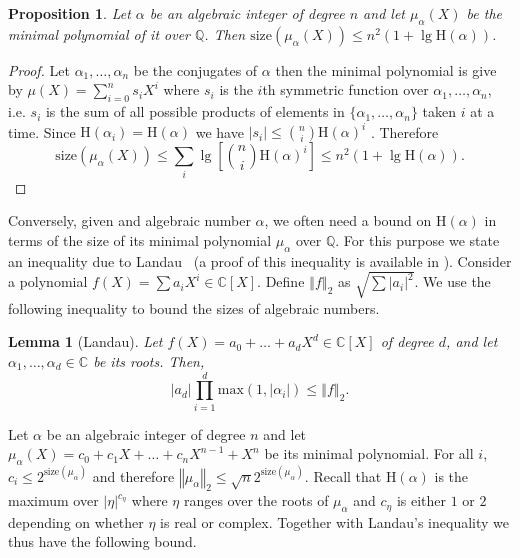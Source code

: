 \documentclass[11pt]{madras}%
\newtheorem{lemma}[theorem]{Lemma}
\newtheorem{proposition}[theorem]{Proposition}
\theoremstyle{remark}
\newcommand{\size}[1]{{\ensuremath{\mathrm{size}\left(#1\right)}}}
\newcommand{\abs}[1]{{\ensuremath{\left\vert #1 \right\vert}}}
\newcommand{\norm}[1]{{\ensuremath{\left\Vert #1 \right\Vert}}}
\newcommand{\Height}[1]{\ensuremath{\mathrm{H}\left(#1\right)}}
\begin{document}
\begin{proposition}\label{prop-bound-minpoly}
  Let $\alpha$ be an algebraic integer of degree $n$ and let
  $\mu_\alpha(X)$ be the minimal polynomial of it over $\mathbb{Q}$.
  Then $\size{\mu_\alpha(X)} \leq n^2 (1 + \lg{\Height{\alpha}})$.
\end{proposition}
\begin{proof}
  Let $\alpha_1,\ldots,\alpha_n$ be the conjugates of $\alpha$ then
  the minimal polynomial is give by $\mu(X) = \sum_{i=0}^n s_i X^i$
  where $s_i$ is the $i$th symmetric function over
  $\alpha_1,\ldots,\alpha_n$, i.e. $s_i$ is the sum of all possible
  products of elements in $\{\alpha_1,\ldots,\alpha_n\}$ taken $i$ at
  a time.  Since $\Height{\alpha_i} = \Height{\alpha}$ we have $|s_i|
  \leq {n \choose i} \Height{\alpha}^i$ .  Therefore
  \[ 
  \size{\mu_\alpha(X)} \leq \sum_i \lg \left[{n \choose i}
    \Height{\alpha}^i\right] \leq n^2 (1 + \lg{\Height{\alpha}}).
  \]
\end{proof}

Conversely, given and algebraic number $\alpha$, we often need a bound
on $\Height{\alpha}$ in terms of the size of its minimal polynomial
$\mu_\alpha$ over $\mathbb{Q}$.  For this purpose we state an
inequality due to Landau~\cite{landau:1905:ineq} (a proof of this
inequality is available in \cite[Theorem 6.31]{gathen:modern}).
Consider a polynomial $f(X) = \sum a_i X^i\in \mathbb{C}[X]$.  Define
$\norm{f}_2$ as $\sqrt{\sum \abs{a_i}^2}$.  We use the following
inequality to bound the sizes of algebraic numbers.

\begin{lemma}[Landau]\label{lem-landau-ineq}
  Let $f(X) = a_0 + \ldots + a_d X^d\in \mathbb{C}[X]$ of degree $d$,
  and let $\alpha_1,\ldots,\alpha_d\in\mathbb{C}$ be its roots.  Then,
  \[
  \abs{a_d}\prod_{i=1}^d \textrm{max}(1,\abs{\alpha_i}) \leq
  \norm{f}_2.
  \]
\end{lemma}

Let $\alpha$ be an algebraic integer of degree $n$ and let
$\mu_{\alpha}(X) = c_0 + c_1 X + \ldots + c_n X^{n-1} + X^n$ be its
minimal polynomial. For all $i$, $c_i \leq 2^\size{\mu_\alpha}$ and
therefore $\norm{\mu_\alpha}_2 \leq \sqrt{n}2^{\size{\mu_\alpha}}$.
Recall that $\Height{\alpha}$ is the maximum over $| \eta |^{c_\eta}$
where $\eta$ ranges over the roots of $\mu_\alpha$ and $c_\eta$ is
either $1$ or $2$ depending on whether $\eta$ is real or complex.
Together with Landau's inequality we thus have the following bound.
\end{document}
